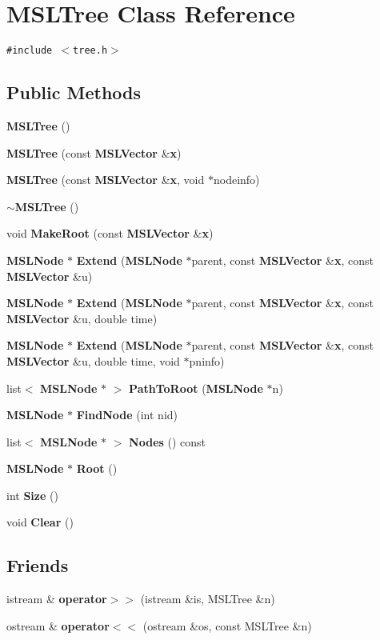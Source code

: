 \section{MSLTree  Class Reference}
\label{classMSLTree}
{\tt \#include $<$tree.h$>$}

\subsection*{Public Methods}
\begin{CompactItemize}
\item 
{\bf MSLTree} ()
\item 
{\bf MSLTree} (const {\bf MSLVector} \&{\bf x})
\item 
{\bf MSLTree} (const {\bf MSLVector} \&{\bf x}, void $\ast$nodeinfo)
\item 
{\bf $\sim$MSLTree} ()
\item 
void {\bf Make\-Root} (const {\bf MSLVector} \&{\bf x})
\item 
{\bf MSLNode} $\ast$ {\bf Extend} ({\bf MSLNode} $\ast$parent, const {\bf MSLVector} \&{\bf x}, const {\bf MSLVector} \&u)
\item 
{\bf MSLNode} $\ast$ {\bf Extend} ({\bf MSLNode} $\ast$parent, const {\bf MSLVector} \&{\bf x}, const {\bf MSLVector} \&u, double time)
\item 
{\bf MSLNode} $\ast$ {\bf Extend} ({\bf MSLNode} $\ast$parent, const {\bf MSLVector} \&{\bf x}, const {\bf MSLVector} \&u, double time, void $\ast$pninfo)
\item 
list$<$ {\bf MSLNode} $\ast$ $>$ {\bf Path\-To\-Root} ({\bf MSLNode} $\ast$n)
\item 
{\bf MSLNode} $\ast$ {\bf Find\-Node} (int nid)
\item 
list$<$ {\bf MSLNode} $\ast$ $>$ {\bf Nodes} () const
\item 
{\bf MSLNode} $\ast$ {\bf Root} ()
\item 
int {\bf Size} ()
\item 
void {\bf Clear} ()
\end{CompactItemize}
\subsection*{Friends}
\begin{CompactItemize}
\item 
istream \& {\bf operator$>$$>$} (istream \&is, MSLTree \&n)
\item 
ostream \& {\bf operator$<$$<$} (ostream \&os, const MSLTree \&n)
\end{CompactItemize}


